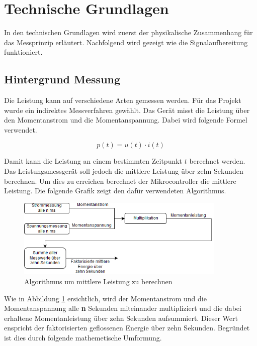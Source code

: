 \pagebreak
\section{Technische Grundlagen}
In den technischen Grundlagen wird zuerst der physikalische Zusammenhang für das Messprinzip erläutert. Nachfolgend wird gezeigt wie die Signalaufbereitung funktioniert.

\subsection{Hintergrund Messung}%
Die Leistung kann auf verschiedene Arten gemessen werden. Für das Projekt wurde ein indirektes Messverfahren gewählt. Das Gerät misst die Leistung über den Momentanstrom und die Momentanspannung. Dabei wird folgende Formel verwendet.

\begin{equation}
	p(t) = u(t) \cdot i(t)
\end{equation}
\label{eq:Momentanleistung}

Damit kann die Leistung an einem bestimmten Zeitpunkt $t$ berechnet werden. Das Leistungsmessgerät soll jedoch die mittlere Leistung über zehn Sekunden berechnen. Um dies zu erreichen berechnet der Mikrocontroller die mittlere Leistung. Die folgende Grafik zeigt den dafür verwendeten Algorithmus.
\begin{figure}[H]
\begin{center}
	\includegraphics[width=100mm]{images/messung_schematisch.png}
	\caption{Algorithmus um mittlere Leistung zu berechnen} %
	\label{fig:berechnung_P}
\end{center}
\end{figure}

Wie in Abbildung \ref{fig:berechnung_P} ersichtlich, wird der Momentanstrom und die Momentanspannung alle \textbf{n} Sekunden miteinander multipliziert und die dabei erhaltene Momentanleistung über zehn Sekunden aufsummiert. Dieser Wert enspricht der faktorisierten geflossenen Energie über zehn Sekunden. Begründet ist dies durch folgende mathemetische Umformung.

